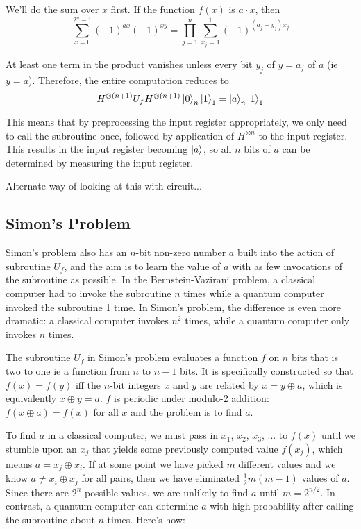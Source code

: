 \documentclass[letterpaper]{article}
\begin{document}
We'll do the sum over $x$ first. If the function $f(x)$ is $a \cdot x$, then 
$$ \sum_{x=0}^{2^{n} - 1} (-1)^{ax} (-1)^{xy} = \prod_{j=1}^{n} \sum_{x_{j} = 1}^{1} (-1)^{(a_{j} + y_{j})x_{j}}$$

At least one term in the product vanishes unless every bit $y_{j}$ of $y = a_{j}$ of $a$ (ie $y = a$). Therefore, the entire computation reduces to
$$H^{\otimes (n+1)} U_{f} H^{\otimes (n+1)} \ket{0}_{n} \ket{1}_{1} = \ket{a}_{n} \ket{1}_{1} $$

This means that by preprocessing the input register appropriately, we only need to call the subroutine once, followed by application of $H^{\otimes n}$ to the input register. This results in the input register becoming $\ket{a}$, so all $n$ bits of $a$ can be determined by measuring the input register. 

Alternate way of looking at this with circuit... 

\subsection{Simon's Problem}
Simon's problem also has an $n$-bit non-zero number $a$ built into the action of subroutine $U_{f}$, and the aim is to learn the value of $a$ with as few invocations of the subroutine as possible. In the Bernstein-Vazirani problem, a classical computer had to invoke the subroutine $n$ times while a quantum computer invoked the subroutine 1 time. In Simon's problem, the difference is even more dramatic: a classical computer invokes $n^{2}$ times, while a quantum computer only invokes $n$ times. 

The subroutine $U_{f}$ in Simon's problem evaluates a function $f$ on $n$ bits that is two to one ie a function from $n$ to $n-1$ bits. It is specifically constructed so that $f(x) = f(y)$ iff the $n$-bit integers $x$ and $y$ are related by $x = y \oplus a$, which is equivalently $x \oplus y = a$. $f$ is periodic under modulo-2 addition: 
$f(x \oplus a) = f(x) $	for all $x$ and the problem is to find $a$. 

To find $a$ in a classical computer, we must pass in $x_{1}$, $x_{2}$, $x_{3}$, ... to $f(x)$ until we stumble upon an $x_{j}$ that yields some previously computed value $f(x_{j})$, which means $a = x_{j} \oplus x_{i}$. If at some point we have picked $m$ different values and we know $a \neq x_{i} \oplus x_{j}$ for all pairs, then we have eliminated $\frac{1}{2}m(m-1)$ values of $a$. Since there are $2^{n}$ possible values, we are unlikely to find $a$ until $m = 2^{n/2}$. In contrast, a quantum computer can determine $a$ with high probability after calling the subroutine about $n$ times. Here's how:
\end{document}
